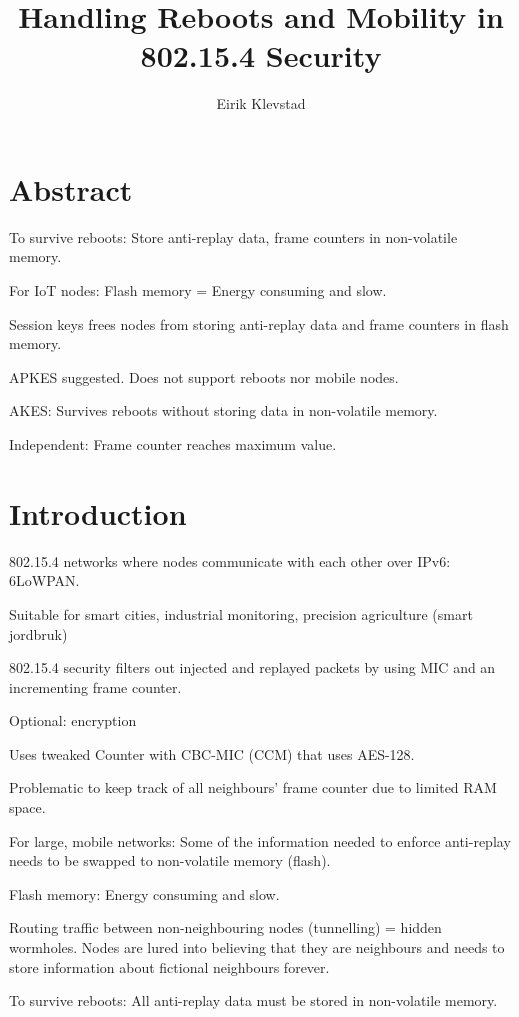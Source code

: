 \documentclass[10pt]{article}
\begin{document}
\author{Eirik Klevstad}
\title{Handling Reboots and Mobility in 802.15.4 Security}
\maketitle


\section{Abstract}

To survive reboots: Store anti-replay data, frame counters in non-volatile memory.

For IoT nodes: Flash memory = Energy consuming and slow. 

Session keys frees nodes from storing anti-replay data and frame counters in flash memory.

APKES suggested. Does not support reboots nor mobile nodes.

AKES: Survives reboots without storing data in non-volatile memory.

Independent: Frame counter reaches maximum value.

\section{Introduction}

802.15.4 networks where nodes communicate with each other over IPv6: 6LoWPAN.

Suitable for smart cities, industrial monitoring, precision agriculture (smart jordbruk)

802.15.4 security filters out injected and replayed packets by using MIC and an incrementing frame counter. 

Optional: encryption

Uses tweaked Counter with CBC-MIC (CCM) that uses AES-128.

Problematic to keep track of all neighbours' frame counter due to limited RAM space. 

For large, mobile networks: Some of the information needed to enforce anti-replay needs to be swapped to non-volatile memory (flash).

Flash memory: Energy consuming and slow.

Routing traffic between non-neighbouring nodes (tunnelling) = hidden wormholes. Nodes are lured into believing that they are neighbours and needs to store information about fictional neighbours forever.

To survive reboots: All anti-replay data must be stored in non-volatile memory.
\end{document}
